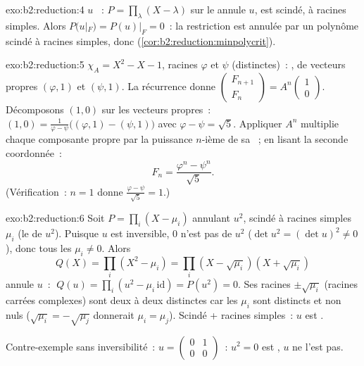 \begin{solution}{exo:b2:reduction:4}
$u$ ~: $P = \prod_{\lambda}(X - \lambda)$ sur le 
annule $u$, est scindé, à racines simples. Alors $P(u|_F) = P(u)|_F =
0$~: la restriction est annulée par un polynôme scindé à racines
simples, donc 
(\cref{cor:b2:reduction:minpolycrit}).
\end{solution}

\begin{solution}{exo:b2:reduction:5}
$\chi_A = X^2 - X - 1$, racines $\varphi$ et $\psi$ (distinctes)~:
, de vecteurs propres $(\varphi, 1)$ et $(\psi, 1)$. La
récurrence donne $\begin{pmatrix} F_{n+1}\\ F_n \end{pmatrix} =
A^n \begin{pmatrix}1\\ 0\end{pmatrix}$. Décomposons $(1, 0)$ sur les
vecteurs propres~: $(1,0) = \frac{1}{\varphi - \psi}\bigl((\varphi, 1) -
(\psi, 1)\bigr)$ avec $\varphi - \psi = \sqrt5$. Appliquer $A^n$
multiplie chaque composante propre par la puissance $n$-ième de sa
~; en lisant la seconde coordonnée~:
\[
F_n = \frac{\varphi^n - \psi^n}{\sqrt 5} .
\]
(Vérification~: $n = 1$ donne $\frac{\varphi - \psi}{\sqrt5} = 1$.)
\end{solution}

\begin{solution}{exo:b2:reduction:6}
Soit $P = \prod_i (X - \mu_i)$ annulant $u^2$, scindé à racines
simples $\mu_i$ (le  de $u^2$). Puisque $u$ est inversible, $0$
n'est pas  de $u^2$ ($\det u^2 = (\det u)^2 \neq 0$), donc
tous les $\mu_i \neq 0$. Alors
\[
Q(X) = \prod_i (X^2 - \mu_i) = \prod_i (X - \sqrt{\mu_i})(X +
\sqrt{\mu_i})
\]
annule $u$~: $\;Q(u) = \prod_i (u^2 - \mu_i\,\mathrm{id}) =
P(u^2) = 0$. Ses racines $\pm
\sqrt{\mu_i}$ (racines carrées complexes) sont deux à deux distinctes
car les $\mu_i$ sont distincts et non nuls ($\sqrt{\mu_i} =
-\sqrt{\mu_j}$ donnerait $\mu_i = \mu_j$). Scindé + racines simples~:
$u$ est .

Contre-exemple sans inversibilité~: $u = \begin{pmatrix} 0 & 1\\
0 & 0\end{pmatrix}$~: $u^2 = 0$ est , $u$ ne l'est pas.
\end{solution}

